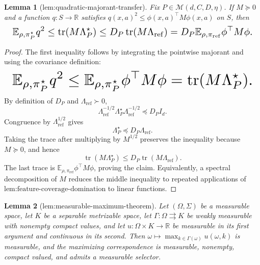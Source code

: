 \documentclass{article}
\newtheorem{lemma}{Lemma}
\begin{document}
\begin{lemma}[lem:quadratic-majorant-transfer]\label{lem:quadratic-majorant-transfer}
Fix \(P\in\mathcal M(d,C,D,\eta)\). If \(M\succeq0\) and a function \(q:S\to\mathbb R\) satisfies \(q(x,a)^2\le\phi(x,a)^\top M\phi(x,a)\) on \(S\), then
\[
\makebox[\linewidth][c]{\resizebox{0.98\linewidth}{!}{\(\displaystyle \mathbb E_{\rho,\pi_P^\star}q^2
\le\operatorname{tr}(M\Lambda_P^\star)
\le D_P\operatorname{tr}(M\Lambda_{\mathrm{ref}})
=D_P\mathbb E_{\rho,\pi_{\mathrm{ref}}}\phi^\top M\phi.\)}}
\]
\end{lemma}
\begin{proof}
The first inequality follows by integrating the pointwise majorant and using the covariance definition:
\[
\makebox[\linewidth][c]{\resizebox{0.98\linewidth}{!}{\(\displaystyle \mathbb E_{\rho,\pi_P^\star}q^2
\le\mathbb E_{\rho,\pi_P^\star}\phi^\top M\phi
=\operatorname{tr}(M\Lambda_P^\star).\)}}
\]
By definition of \(D_P\) and \(\Lambda_{\mathrm{ref}}\succ0\),
\[
\Lambda_{\mathrm{ref}}^{-1/2}\Lambda_P^\star\Lambda_{\mathrm{ref}}^{-1/2}\preceq D_PI_d.
\]
Congruence by \(\Lambda_{\mathrm{ref}}^{1/2}\) gives
\[
\Lambda_P^\star\preceq D_P\Lambda_{\mathrm{ref}}.
\]
Taking the trace after multiplying by \(M^{1/2}\) preserves the inequality because \(M\succeq0\), and hence
\[
\operatorname{tr}(M\Lambda_P^\star)
\le D_P\operatorname{tr}(M\Lambda_{\mathrm{ref}}).
\]
The last trace is \(\mathbb E_{\rho,\pi_{\mathrm{ref}}}\phi^\top M\phi\), proving the claim. Equivalently, a spectral decomposition of \(M\) reduces the middle inequality to repeated applications of \(\text{lem:feature-coverage-domination}\) to linear functions.
\end{proof}

\begin{lemma}[lem:measurable-maximum-theorem]\label{lem:measurable-maximum-theorem}
Let \((\Omega,\Sigma)\) be a measurable space, let \(K\) be a separable metrizable space, let \(\Gamma:\Omega\rightrightarrows K\) be weakly measurable with nonempty compact values, and let \(u:\Omega\times K\to\mathbb R\) be measurable in its first argument and continuous in its second. Then \(\omega\mapsto\max_{k\in\Gamma(\omega)}u(\omega,k)\) is measurable, and the maximizing correspondence is measurable, nonempty, compact valued, and admits a measurable selector.
\end{lemma}
\end{document}
